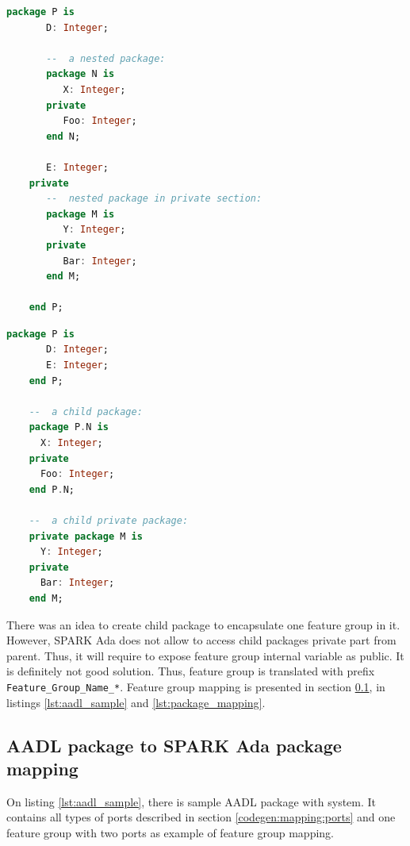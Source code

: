 \singlespacing
\begin{lstlisting}[language=ada, frame=single, gobble=0, caption={Nested packages in SPARK Ada}]
	package P is
	   D: Integer;

	   --  a nested package:
	   package N is
	      X: Integer;
	   private
	      Foo: Integer;
	   end N;

	   E: Integer;
	private
	   --  nested package in private section:
	   package M is
	      Y: Integer;
	   private
	      Bar: Integer;
	   end M;

	end P;
\end{lstlisting}
\label{lst:nested_packages}
\doublespacing

\singlespacing
\begin{lstlisting}[language=ada, frame=single, gobble=0, caption={Child packages in SPARK Ada}]
	package P is
	   D: Integer;
	   E: Integer;
	end P;

	--  a child package:
	package P.N is
      X: Integer;
   	private
      Foo: Integer;
	end P.N;

	--  a child private package:
	private package M is
	  Y: Integer;
	private
	  Bar: Integer;
	end M;
\end{lstlisting}
\label{lst:child_packages}
\doublespacing

There was an idea to create child package to encapsulate one feature group in it. However, SPARK Ada does not allow to access child packages private part from parent. Thus, it will require to expose feature group internal variable as public. It is definitely not good solution. Thus, feature group is translated with prefix \lstinline{Feature_Group_Name_*}. Feature group mapping is presented in section \ref{codegen:mapping:packages}, in listings \ref{lst:aadl_sample} and \ref{lst:package_mapping}.


\subsection{AADL package to SPARK Ada package mapping}
\label{codegen:mapping:packages}

On listing \ref{lst:aadl_sample}, there is sample AADL package with system. It contains all types of ports described in section \ref{codegen:mapping:ports} and one feature group with two ports as example of feature group mapping.


